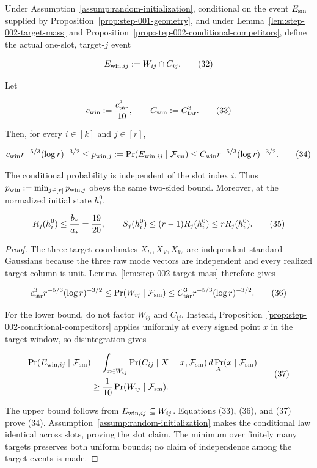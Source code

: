 \begin{proposition}\label{prop:step-002-joint-window}
Under Assumption~\ref{assump:random-initialization}, conditional on the
event $E_{\rm sm}$ supplied by Proposition~\ref{prop:step-001-geometry},
and under Lemma~\ref{lem:step-002-target-mass} and
Proposition~\ref{prop:step-002-conditional-competitors}, define the actual
one-slot, target-$j$ event

\[
E_{{\rm win},ij}:=W_{ij}\cap C_{ij}.
\tag{32}
\]

Let

\[
c_{\rm win}:={c_{\rm tar}^3\over10},
\qquad C_{\rm win}:=C_{\rm tar}^3.
\tag{33}
\]

Then, for every $i\in[k]$ and $j\in[r]$,

\[
c_{\rm win}r^{-5/3}(\log r)^{-3/2}
\le p_{{\rm win},j}
:=\Pr(E_{{\rm win},ij}\mid\mathcal F_{\rm sm})
\le C_{\rm win}r^{-5/3}(\log r)^{-3/2}.
\tag{34}
\]

The conditional probability is independent of the slot index $i$. Thus
$p_{\rm win}:=\min_{j\in[r]}p_{{\rm win},j}$ obeys the same two-sided
bound. Moreover, at the normalized initial state $h_i^0$,

\[
R_j(h_i^0)\le {b_*\over a_*}={19\over20},
\qquad S_j(h_i^0)\le(r-1)R_j(h_i^0)\le rR_j(h_i^0).
\tag{35}
\]

\begin{proof}
The three target coordinates $X_U,X_V,X_W$ are independent standard
Gaussians because the three raw mode vectors are independent and every
realized target column is unit. Lemma~\ref{lem:step-002-target-mass}
therefore gives

\[
c_{\rm tar}^3r^{-5/3}(\log r)^{-3/2}
\le\Pr(W_{ij}\mid\mathcal F_{\rm sm})
\le C_{\rm tar}^3r^{-5/3}(\log r)^{-3/2}.
\tag{36}
\]

For the lower bound, do not factor $W_{ij}$ and $C_{ij}$. Instead,
Proposition~\ref{prop:step-002-conditional-competitors} applies uniformly
at every signed point $x$ in the target window, so disintegration gives

\[
\begin{aligned}
\Pr(E_{{\rm win},ij}\mid\mathcal F_{\rm sm})
&=\int_{x\in W_{ij}}
 \Pr(C_{ij}\mid X=x,\mathcal F_{\rm sm})\,
 d\Pr_X(x\mid\mathcal F_{\rm sm})\\
&\ge {1\over10}\Pr(W_{ij}\mid\mathcal F_{\rm sm}).
\end{aligned}
\tag{37}
\]

The upper bound follows from $E_{{\rm win},ij}\subseteq W_{ij}$. Equations
(33), (36), and (37) prove (34). Assumption~\ref{assump:random-initialization}
makes the conditional law identical across slots, proving the slot claim.
The minimum over finitely many targets preserves both uniform bounds; no
claim of independence among the target events is made.


\end{proof}
\end{proposition}
